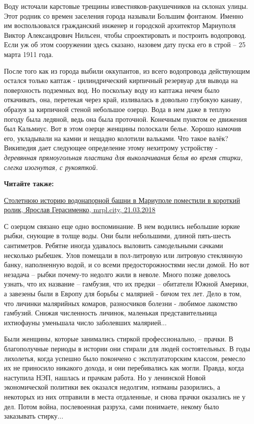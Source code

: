 
Воду источали карстовые трещины известняков-ракушечников на склонах улицы. Этот
родник со времен заселения города называли Большим фонтаном. Именно им
воспользовался гражданский инженер и городской архитектор Мариуполя Виктор
Александрович Нильсен, чтобы спроектировать и построить водопровод. Если уж об
этом сооружении здесь сказано, назовем дату пуска его в строй – 25 марта 1911
года.

После того как из города выбили оккупантов, из всего водопровода действующим
остался только каптаж - цилиндрический кирпичный резервуар для вывода на
поверхность подземных вод. Но поскольку воду из каптажа нечем было откачивать,
она, перетекая через край, изливалась в довольно глубокую канаву, образуя за
кирпичной стеной небольшое озерцо. Вода в нем даже в теплую погоду была
ледяной, ведь она была проточной. Конечным пунктом ее движения был Кальмиус.
Вот в этом озерце женщины полоскали белье. Хорошо намочив его, укладывали на
камни и нещадно колотили вальками. Что такое валёк? Википедия дает следующее
определение этому нехитрому устройству - \emph{деревянная прямоугольная пластина для
выколачивания белья во время стирки, слегка изогнутая, с рукояткой.}

\textbf{Читайте также:} 

\href{https://mrpl.city/news/view/stoletnyuyu-istoriyu-vodonapornoj-bashni-v-mariupole-pomestili-v-korotkij-rolik-video}{%
Столетнюю историю водонапорной башни в Мариуполе поместили в короткий ролик, Ярослав Герасименко, mrpl.city, 21.03.2018}

С озерцом связано еще одно воспоминание. В нем водились небольшие юркие рыбки,
снующие в толще воды. Они были небольшими, длиной пять-шесть сантиметров.
Ребятне иногда удавалось выловить самодельными сачками несколько рыбешек. Улов
помещали в пол-литровую или литровую стеклянную банку, наполненную водой, и со
всеми предосторожностями несли домой. Но вот незадача – рыбки почему-то недолго
жили в неволе. Много позже довелось узнать, что их название – гамбузия, что их
предки – обитатели Южной Америки, а завезены были в Европу для борьбы с
малярией - бичом тех лет. Дело в том, что личинки малярийных комаров,
разносчиков болезни - любимое лакомство гамбузий. Снижая численность личинок,
маленькая представительница ихтиофауны уменьшала число заболевших малярией...

Были женщины, которые занимались стиркой профессионально, – прачки. В
благополучные периоды в истории они стирали для людей состоятельных. В годы
лихолетья, когда успешно было покончено с эксплуататорским классом, ремесло их
не приносило никакого дохода, и они перебивались как могли. Правда, когда
наступила НЭП, нашлась и прачкам работа. Но у ленинской Новой экономической
политики век оказался недолгим, нэпманы разорились, а некоторых из них
отправили в места отдаленные, и снова прачки оказались не у дел. Потом война,
послевоенная разруха, сами понимаете, некому было заказывать стирку...


